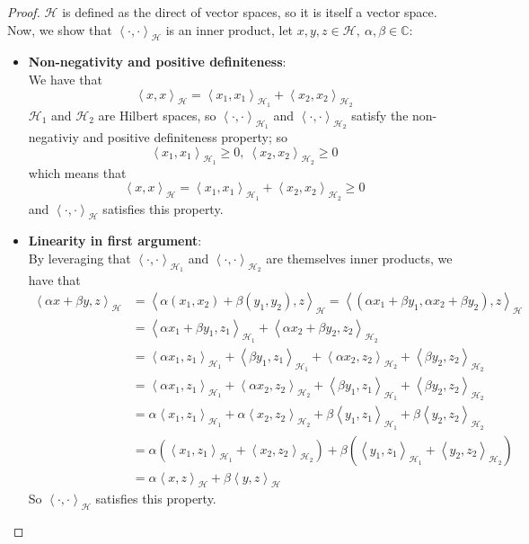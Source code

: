\documentclass{article}
\newcommand{\parens}[1]{\left(#1\right)}
\newcommand{\C}{\mathbb{C}}
\newcommand{\hilbert}{\mathcal{H}}
\newcommand{\abracks}[1]{\left< #1\right>}
\begin{document}
        \begin{proof}
        $\hilbert$ is defined as the direct of vector spaces, so it is itself a 
        vector space. Now, we show that $\abracks{\cdot,\cdot}_\hilbert$ is an 
        inner product, let $x,y,z \in \hilbert,\ \alpha, \beta \in \C$:
        \begin{itemize}
            \item \textbf{Non-negativity and positive definiteness}:\\
            We have that 
            $$\abracks{x,x}_\hilbert = \abracks{x_1,x_1}_{\hilbert_1} + 
            \abracks{x_2,x_2}_{\hilbert_2}$$
            $\hilbert_1$ and $\hilbert_2$ are Hilbert spaces, so 
            $\abracks{\cdot, \cdot}_{\hilbert_1}$ and $\abracks{\cdot, \cdot}_{\hilbert_2}$
            satisfy the non-negativiy and positive definiteness property; so
            $$\abracks{x_1,x_1}_{\hilbert_1} \geq 0,\ 
            \abracks{x_2,x_2}_{\hilbert_2} \geq 0$$
            which means that 
            $$\abracks{x,x}_\hilbert = \abracks{x_1,x_1}_{\hilbert_1} + 
            \abracks{x_2,x_2}_{\hilbert_2} \geq 0$$
            and $\abracks{\cdot,\cdot}_\hilbert$ satisfies this property.

            \item \textbf{Linearity in first argument}:\\
            By leveraging that $\abracks{\cdot,\cdot}_{\hilbert_1}$ and 
            $\abracks{\cdot,\cdot}_{\hilbert_2}$ are themselves inner products, we have that
            \begin{align*}
            \abracks{\alpha x + \beta y, z}_\hilbert &= \abracks{\alpha(x_1, x_2) + 
            \beta(y_1,y_2), z}_\hilbert = 
            \abracks{(\alpha x_1 + \beta y_1, \alpha x_2 + \beta y_2), z}_\hilbert \\
            &= \abracks{\alpha x_1 + \beta y_1, z_1}_{\hilbert_1} + 
            \abracks{\alpha x_2 + \beta y_2, z_2}_{\hilbert_2} \\
            &= \abracks{\alpha x_1,z_1}_{\hilbert_1} + \abracks{\beta y_1, z_1}_{\hilbert_1} + 
            \abracks{\alpha x_2,z_2}_{\hilbert_2} + \abracks{\beta y_2, z_2}_{\hilbert_2} \\
            &= \abracks{\alpha x_1,z_1}_{\hilbert_1} + \abracks{\alpha x_2,z_2}_{\hilbert_2} + 
            \abracks{\beta y_1, z_1}_{\hilbert_1} +\abracks{\beta y_2, z_2}_{\hilbert_2} \\
            &= \alpha\abracks{x_1,z_1}_{\hilbert_1} +  \alpha\abracks{x_2,z_2}_{\hilbert_2} + 
            \beta\abracks{y_1, z_1}_{\hilbert_1} + \beta\abracks{y_2, z_2}_{\hilbert_2} \\
            &= \alpha\parens{\abracks{x_1,z_1}_{\hilbert_1} + \abracks{x_2,z_2}_{\hilbert_2}} + 
            \beta\parens{\abracks{y_1, z_1}_{\hilbert_1} + \abracks{y_2, z_2}_{\hilbert_2}} \\
            &= \alpha\abracks{x, z}_\hilbert + \beta\abracks{y, z}_\hilbert
            \end{align*}
            So $\abracks{\cdot, \cdot}_\hilbert$ satisfies this property.


\end{itemize}
\end{proof}
\end{document}

